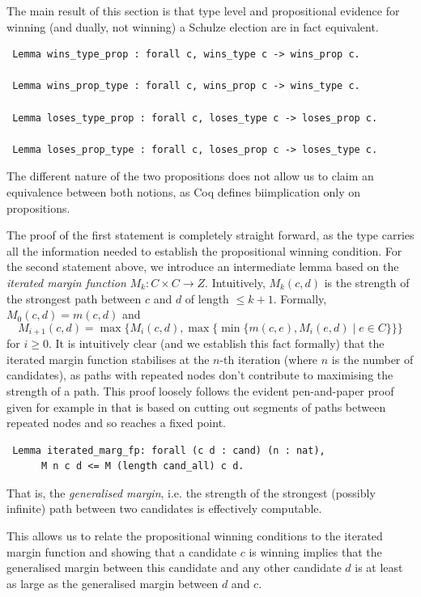 \noindent
The main result of this section is that type level and propositional
evidence for winning (and dually, not winning) a Schulze election
are in fact equivalent.

\begin{verbatim}
 Lemma wins_type_prop : forall c, wins_type c -> wins_prop c.

 Lemma wins_prop_type : forall c, wins_prop c -> wins_type c.
 
 Lemma loses_type_prop : forall c, loses_type c -> loses_prop c.
 
 Lemma loses_prop_type : forall c, loses_prop c -> loses_type c.
\end{verbatim}

\noindent
The different nature of the two propositions does not allow
us to claim an equivalence between both notions, as Coq defines
biimplication only on propositions.

The proof of the first statement is completely straight forward, as
the type carries all the information needed to establish the
propositional winning condition. For the second statement above, we
introduce an intermediate lemma based on the \emph{iterated margin
function}
$M_k: C \times C \to Z$. Intuitively, $M_k (c, d)$ is the
strength of the strongest path between $c$ and $d$ of length $\leq
k+1$. Formally,
$M_0 (c, d) = m(c, d)$ and
\[ M_{i+1}(c, d) = \max \lbrace M_i(c, d), \max \lbrace  \min
\lbrace m(c, e), M_i(e, d) \mid e \in C \rbrace \rbrace \rbrace
\] for $i \geq 0$.
%
It is intuitively clear (and we establish this fact formally) that
the iterated margin function stabilises at the $n$-th iteration
(where $n$ is the number of candidates), as paths with repeated
nodes don't contribute to maximising the strength of a path. This
proof loosely follows the evident pen-and-paper proof given for
example in
\cite{Carre:1971:ANR} that is based on cutting out segments of paths
between repeated nodes and so reaches a fixed point.

\begin{verbatim}
 Lemma iterated_marg_fp: forall (c d : cand) (n : nat),
      M n c d <= M (length cand_all) c d.
\end{verbatim}

\noindent
That is, the \emph{generalised margin}, i.e. the strength of the strongest (possibly infinite) path
between two candidates is
effectively computable.

This allows us to relate the propositional winning conditions to the
iterated margin function and showing that a candidate $c$ is winning
implies that the generalised margin between this candidate and any
other candidate $d$ is at least as large as the generalised margin between $d$
and $c$.

